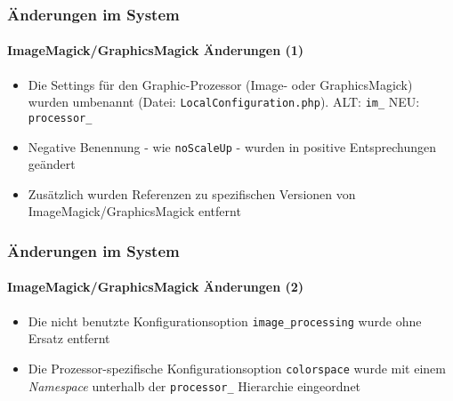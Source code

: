 \begin{frame}[fragile]
	\frametitle{Änderungen im System}
	\framesubtitle{ImageMagick/GraphicsMagick Änderungen (1)}

	\lstset{basicstyle=\tiny\ttfamily}

	\begin{itemize}

		\item Die Settings für den Graphic-Prozessor (Image- oder GraphicsMagick) wurden umbenannt
			(Datei: \texttt{LocalConfiguration.php}).\newline
			ALT:\tabto{1.0cm} \texttt{im\_}\newline
			NEU:\tabto{1.0cm} \texttt{processor\_}

		\item Negative Benennung - wie \texttt{noScaleUp} - wurden in positive Entsprechungen geändert

		\item Zusätzlich wurden Referenzen zu spezifischen Versionen von ImageMagick/GraphicsMagick entfernt

	\end{itemize}

\end{frame}

\begin{frame}[fragile]
	\frametitle{Änderungen im System}
	\framesubtitle{ImageMagick/GraphicsMagick Änderungen (2)}

	\lstset{basicstyle=\tiny\ttfamily}

	\begin{itemize}

		\item Die nicht benutzte Konfigurationsoption \texttt{image\_processing} wurde ohne Ersatz entfernt

		\item Die Prozessor-spezifische Konfigurationsoption \texttt{colorspace} wurde mit einem  \textit{Namespace} unterhalb der \texttt{processor\_} Hierarchie eingeordnet

	\end{itemize}

\end{frame}

